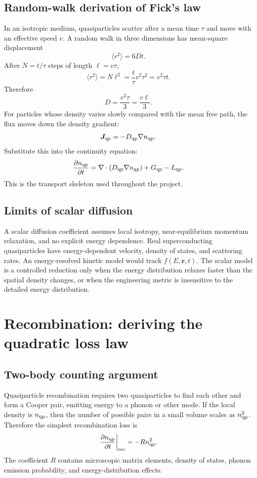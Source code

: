 \documentclass[11pt]{article}
\newcommand{\br}{{\bm{r}}}
\newcommand{\rec}{\mathrm{rec}}
\begin{document}
\subsection{Random-walk derivation of Fick's law}
In an isotropic medium, quasiparticles scatter after a mean time $\tau$ and move with an effective speed $v$. A random walk in three dimensions has mean-square displacement
\begin{equation}
\langle r^2\rangle=6Dt.
\end{equation}
After $N=t/\tau$ steps of length $\ell=v\tau$,
\begin{equation}
\langle r^2\rangle=N\ell^2=\frac{t}{\tau}v^2\tau^2=v^2\tau t.
\end{equation}
Therefore
\begin{equation}
D=\frac{v^2\tau}{3}=\frac{v\ell}{3}.
\end{equation}
For particles whose density varies slowly compared with the mean free path, the flux moves down the density gradient:
\begin{equation}
\bm{J}_{\mathrm{qp}}=-D_{\mathrm{qp}}\nabla n_{\mathrm{qp}}.
\end{equation}
Substitute this into the continuity equation:
\begin{equation}
\frac{\partial n_{\mathrm{qp}}}{\partial t}=\nabla\cdot(D_{\mathrm{qp}}\nabla n_{\mathrm{qp}})+G_{\mathrm{qp}}-L_{\mathrm{qp}}.
\end{equation}
This is the transport skeleton used throughout the project.

\subsection{Limits of scalar diffusion}
A scalar diffusion coefficient assumes local isotropy, near-equilibrium momentum relaxation, and no explicit energy dependence. Real superconducting quasiparticles have energy-dependent velocity, density of states, and scattering rates. An energy-resolved kinetic model would track $f(E,\br,t)$. The scalar model is a controlled reduction only when the energy distribution relaxes faster than the spatial density changes, or when the engineering metric is insensitive to the detailed energy distribution.

\section{Recombination: deriving the quadratic loss law}

\subsection{Two-body counting argument}
Quasiparticle recombination requires two quasiparticles to find each other and form a Cooper pair, emitting energy to a phonon or other mode. If the local density is $n_{\mathrm{qp}}$, then the number of possible pairs in a small volume scales as $n_{\mathrm{qp}}^2$. Therefore the simplest recombination loss is
\begin{equation}
\left.\frac{\partial n_{\qp}}{\partial t}\right|_{\rec}=-R n_{\qp}^2.
\end{equation}
The coefficient $R$ contains microscopic matrix elements, density of states, phonon emission probability, and energy-distribution effects.
\end{document}
